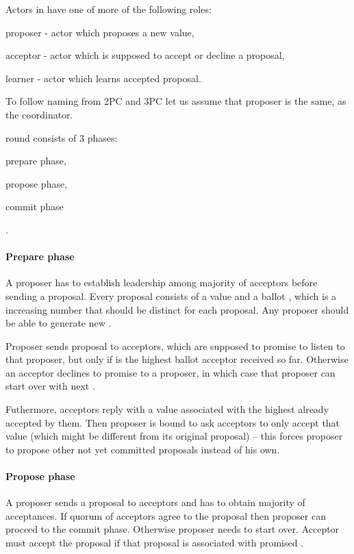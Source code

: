 Actors in \paxos have one of more of the following roles: \begin{enumerate*}[label=\alph*)]
\item proposer - actor which proposes a new value,
\item acceptor - actor which is supposed to accept or decline a proposal,
\item learner - actor which learns accepted proposal.
\end{enumerate*} To follow naming from 2PC and 3PC let us assume that proposer is the same, as the coordinator.

\paxos round consists of $3$ phases: \begin{enumerate*}[label=\alph*)] \item prepare phase, \item propose phase, \item commit phase \end{enumerate*}.

\paragraph{Prepare phase}
A proposer has to establish leadership among majority of acceptors before sending a proposal. Every proposal consists of a value and a ballot \ballot, which is a increasing number that should be distinct for each proposal. Any proposer should be able to generate new \ballot.

Proposer sends proposal \ballot to acceptors, which are supposed to promise to listen to that proposer, but only if \ballot is the highest ballot acceptor received so far. Otherwise an acceptor declines to promise to a proposer, in which case that proposer can start over with next \ballot. 

Futhermore, acceptors reply with a value associated with the highest \ballot already accepted by them. Then proposer is bound to ask acceptors to only accept that value (which might be different from its original proposal) -- this forces proposer to propose other not yet committed proposals instead of his own.

\paragraph{Propose phase}
A proposer sends a proposal to acceptors and has to obtain majority of acceptances. If quorum of acceptors agree to the proposal then proposer can proceed to the commit phase. Otherwise proposer needs to start over. Acceptor must accept the proposal if that proposal is associated with promised \ballot.


